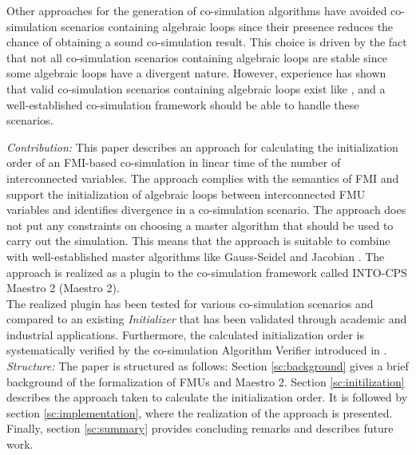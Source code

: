 \noindent Other approaches for the generation of co-simulation algorithms have avoided co-simulation scenarios containing algebraic loops since their presence reduces the chance of obtaining a sound co-simulation result\cite{Amalio2016CheckingCo-simulation, BromanCompositionCo-Simulation}. This choice is driven by the fact that not all co-simulation scenarios containing algebraic loops are stable since some algebraic loops have a divergent nature. However, experience has shown that valid co-simulation scenarios containing algebraic loops exist like , and a well-established co-simulation framework should be able to handle these scenarios. 

\textit{Contribution:} This paper describes an approach for calculating the initialization order of an FMI-based co-simulation in linear time of the number of interconnected variables. The approach complies with the semantics of FMI and support the initialization of algebraic loops between interconnected FMU variables and identifies divergence in a co-simulation scenario. The approach does not put any constraints on choosing a master algorithm that should be used to carry out the simulation. This means that the approach is suitable to combine with well-established master algorithms like Gauss-Seidel and Jacobian \cite{Palensky2017}. The approach is realized as a plugin to the co-simulation framework called INTO-CPS Maestro 2 (Maestro 2). \\
The realized plugin has been tested for various co-simulation scenarios and compared to an existing \textit{Initializer} that has been validated through academic and industrial applications. 
Furthermore, the calculated initialization order is systematically verified by the co-simulation Algorithm Verifier introduced in \cite{gomes_lucio_vangheluwe_2019}. \\

\textit{Structure:} The paper is structured as follows: Section \ref{sc:background} gives a brief background of the formalization of FMUs and Maestro 2. Section \ref{sc:initilization} describes the approach taken to calculate the initialization order. It is followed by section \ref{sc:implementation}, where the realization of the approach is presented. Finally, section \ref{sc:summary} provides concluding remarks and describes future work.